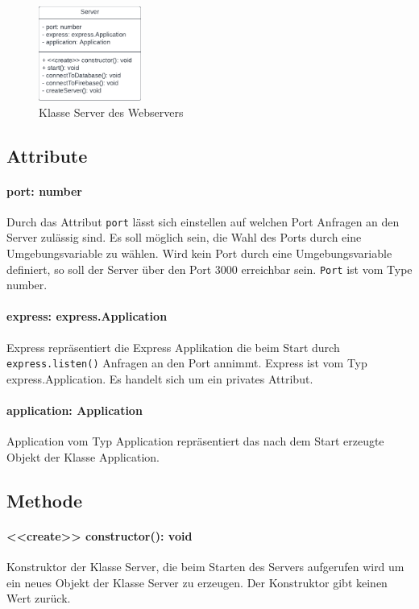\documentclass[parskip=full]{scrartcl}
\begin{document}
\begin{figure}[htp]
    \centering
    \includegraphics[width = 0.3\textwidth]{images/webserver/server.pdf}
    \caption{Klasse Server des Webservers}
    \label{fig:server}
\end{figure}

\subsection*{Attribute}
\paragraph{port: number}Durch das Attribut \texttt{port} lässt sich einstellen auf welchen Port Anfragen an den Server zulässig sind. Es soll möglich sein, die Wahl des Ports durch eine Umgebungsvariable zu wählen. Wird kein Port durch eine Umgebungsvariable definiert, so soll der Server über den Port 3000 erreichbar sein.
\texttt{Port} ist vom Type number.
\paragraph{express: express.Application}Express repräsentiert die Express Applikation die beim Start durch \texttt{express.listen()} Anfragen an den Port annimmt.
Express ist vom Typ express.Application. Es handelt sich um ein privates Attribut.
\paragraph{application: Application}Application vom Typ Application repräsentiert das nach dem Start erzeugte Objekt der Klasse Application.

\subsection*{Methode}
\paragraph{<<create>> constructor(): void}Konstruktor der Klasse Server, die beim Starten des Servers aufgerufen wird um ein neues Objekt der Klasse Server zu erzeugen. Der Konstruktor gibt keinen Wert zurück.
\end{document}
